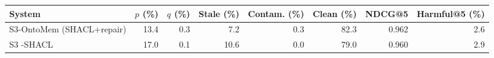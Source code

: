 \begin{tabular}{lrrrrrrr}
\toprule
System & $p$ (\%) & $q$ (\%) & Stale (\%) & Contam. (\%) & Clean (\%) & NDCG@5 & Harmful@5 (\%) \\
\midrule
S3-OntoMem (SHACL+repair) & 13.4 & 0.3 & 7.2 & 0.3 & 82.3 & 0.962 & 2.6 \\
S3 -SHACL & 17.0 & 0.1 & 10.6 & 0.0 & 79.0 & 0.960 & 2.9 \\
\bottomrule
\end{tabular}
